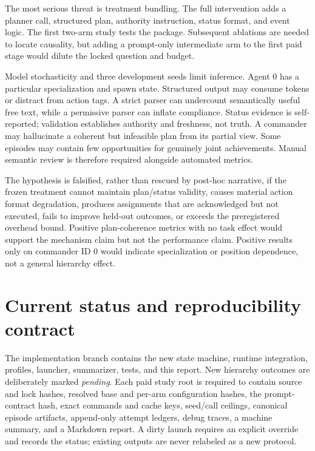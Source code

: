 \documentclass[11pt]{article}
\begin{document}
The most serious threat is treatment bundling.  The full intervention adds a
planner call, structured plan, authority instruction, status format, and event
logic.  The first two-arm study tests the package.  Subsequent ablations are
needed to locate causality, but adding a prompt-only intermediate arm to the first
paid stage would dilute the locked question and budget.

Model stochasticity and three development seeds limit inference.  Agent 0 has a
particular specialization and spawn state.  Structured output may consume tokens
or distract from action tags.  A strict parser can undercount semantically useful
free text, while a permissive parser can inflate compliance.  Status evidence is
self-reported; validation establishes authority and freshness, not truth.  A
commander may hallucinate a coherent but infeasible plan from its partial view.
Some episodes may contain few opportunities for genuinely joint achievements.
Manual semantic review is therefore required alongside automated metrics.

The hypothesis is falsified, rather than rescued by post-hoc narrative, if the
frozen treatment cannot maintain plan/status validity, causes material action
format degradation, produces assignments that are acknowledged but not executed,
fails to improve held-out outcomes, or exceeds the preregistered overhead bound.
Positive plan-coherence metrics with no task effect would support the mechanism
claim but not the performance claim.  Positive results only on commander ID 0
would indicate specialization or position dependence, not a general hierarchy
effect.

\section{Current status and reproducibility contract}

The implementation branch contains the new state machine, runtime integration,
profiles, launcher, summarizer, tests, and this report.  New hierarchy outcomes
are deliberately marked \emph{pending}.  Each paid study root is required to
contain source and lock hashes, resolved base and per-arm configuration hashes,
the prompt-contract hash, exact commands and cache keys, seed/call ceilings,
canonical episode artifacts, append-only attempt ledgers, debug traces, a machine
summary, and a Markdown report.  A dirty launch requires an explicit override and
records the status; existing outputs are never relabeled as a new protocol.
\end{document}

